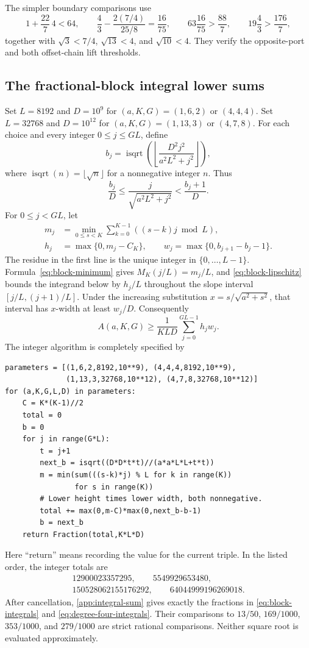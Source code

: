 \documentclass[11pt,reqno]{amsart}
\numberwithin{equation}{section}
\begin{document}
The simpler boundary comparisons use
\[
 1+\frac{22}{7}\,4<64,\qquad
 \frac43-\frac{2(7/4)}{25/8}=\frac{16}{75},\qquad
 63\frac{16}{75}>\frac{88}{7},\qquad
 19\frac43>\frac{176}{7},
\]
together with $\sqrt3<7/4$, $\sqrt{13}<4$, and $\sqrt{10}<4$.
They verify the opposite-port and both offset-chain lift thresholds.

\subsection{The fractional-block integral lower sums}

Set $L=8192$ and $D=10^9$ for $(a,K,G)=(1,6,2)$ or $(4,4,4)$.
Set $L=32768$ and $D=10^{12}$ for $(a,K,G)=(1,13,3)$ or $(4,7,8)$.
For each choice and every integer $0\le j\le GL$, define
\[
 b_j=\operatorname{isqrt}\left(
      \left\lfloor\frac{D^2j^2}{a^2L^2+j^2}\right\rfloor\right),
\]
where $\operatorname{isqrt}(n)=\lfloor\sqrt n\rfloor$ for a
nonnegative integer $n$. Thus
\[
 \frac{b_j}{D}\le\frac{j}{\sqrt{a^2L^2+j^2}}
                    <\frac{b_j+1}{D}.
\]
For $0\le j<GL$, let
\[
 \begin{split}
 m_j&=\min_{0\le s<K}\sum_{k=0}^{K-1}
                   ((s-k)j\bmod L),\\
 h_j&=\max\{0,m_j-C_K\},\qquad
 w_j=\max\{0,b_{j+1}-b_j-1\}.
 \end{split}
\]
The residue in the first line is the unique integer in
$\{0,\ldots,L-1\}$. Formula~\eqref{eq:block-minimum} gives
$M_K(j/L)=m_j/L$, and \eqref{eq:block-lipschitz} bounds the integrand
below by $h_j/L$ throughout the slope interval $[j/L,(j+1)/L]$.
Under the increasing substitution $x=s/\sqrt{a^2+s^2}$, that interval
has $x$-width at least $w_j/D$. Consequently
\begin{equation}
 A(a,K,G)\ge\frac1{KLD}\sum_{j=0}^{GL-1}h_jw_j.
 \label{app:integral-sum}
\end{equation}
The integer algorithm is completely specified by
\begin{verbatim}
parameters = [(1,6,2,8192,10**9), (4,4,4,8192,10**9),
              (1,13,3,32768,10**12), (4,7,8,32768,10**12)]
for (a,K,G,L,D) in parameters:
    C = K*(K-1)//2
    total = 0
    b = 0
    for j in range(G*L):
        t = j+1
        next_b = isqrt((D*D*t*t)//(a*a*L*L+t*t))
        m = min(sum(((s-k)*j) % L for k in range(K))
                for s in range(K))
        # Lower height times lower width, both nonnegative.
        total += max(0,m-C)*max(0,next_b-b-1)
        b = next_b
    return Fraction(total,K*L*D)
\end{verbatim}
Here ``return'' means recording the value for the current triple. In the
listed order, the integer totals are
\[
 \begin{gathered}
 12900023357295,\qquad5549929653480,\\
 150528062155176292,\qquad64044999196269018.
 \end{gathered}
\]
After cancellation, \eqref{app:integral-sum} gives exactly the fractions
in \eqref{eq:block-integrals} and \eqref{eq:degree-four-integrals}.
Their comparisons to $13/50$, $169/1000$, $353/1000$, and $279/1000$
are strict rational comparisons. Neither square root is evaluated
approximately.
\end{document}
